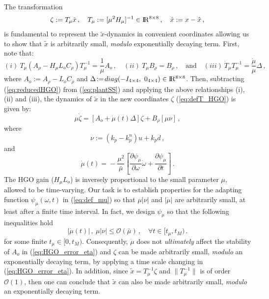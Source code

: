 \documentclass[letterpaper, 10 pt, journal, twocolumn]{IEEEtran}  %
\def\re{{\rm I}\! {\rm R}}
\theoremstyle{plain}
\theoremstyle{definition}
\theoremstyle{remark}
\begin{document}
The transformation \cite{OK:97}
%
\begin{equation}
\zeta:=T_{\mu}\tilde{x}\,, \quad T_\mu:=[\mu^2
H_\mu]^{-1} \in \re^{8 \times 8}\,, \quad \tilde{x}:= x-\hat{x}\,,\label{eq:defT_HGO}
\end{equation}
%
is fundamental to represent the $\tilde{x}$-dynamics in 
convenient coordinates allowing us to show that $\tilde{x}$ is
arbitrarily small, {\em modulo} exponentially decaying term. First,
note that:
%
$$(i) \ T_\mu(A_\rho-H_\mu L_o
C_\rho)T_\mu^{-1}\!=\!\frac{1}{\mu}A_o\,, \quad (ii) \ T_\mu B_\rho\!=\!B_\rho\,, \quad \mbox{and} \quad
(iii) \ \dot{T}_\mu T_\mu^{-1}\!=\!\frac{\dot{\mu}}{\mu}
\Delta\,,$$
%
where $A_o\!:=\!A_\rho\!-\!L_o C_\rho$ and
$\Delta\!:=\!\mbox{diag}(-I_{4 \times 4}, \ 0_{4 \times 4}) \in \re^{8 \times 8}$.
%
Then, subtracting (\ref{eq:reducedHGO}) from
(\ref{eq:plantSS}) and applying the above
relationships (i),
(ii) and (iii), the dynamics of $\tilde{x}$ 
in the new coordinates $\zeta$ (\ref{eq:defT_HGO}) is given by:
%
\begin{equation}
\mu \dot{\zeta} = [A_o+ \dot{\mu}(t) \Delta] \zeta + B_\rho [\mu
\nu]\,, \label{eq:HGO_error_eta}
\end{equation}
%
where %
%
\begin{equation}
\nu:=(k_p-k_p^n)u+k_p d\,,\label{eq:def_nu}
\end{equation}
%
and
%
\begin{equation}
\dot{\mu}(t)\!=\!-\frac{\mu^2}{\bar{\mu}} \left[\frac{\partial
\psi_\mu}{\partial \omega} \dot{\omega}+\frac{\partial
\psi_\mu}{\partial t}\right]\,. \label{eq:def_mudot}
\end{equation}
%
The HGO gain ($H_\mu L_o$) is inversely proportional to the small parameter $\mu$,
allowed to be time-varying. %
Our task is to establish properties for the adapting
function $\psi_\mu(\omega,t)$ in (\ref{eq:def_mu}) so that $\mu
|\nu|$ and $|\dot{\mu}|$ are arbitrarily small, at least after a
finite time interval. In fact, we design $\psi_\mu$ so that the following inequalities hold
%
\begin{equation}
|\dot{\mu}(t)|\,, \ \mu |\nu| \leq \mathcal{O}(\bar{\mu})\,, \quad
\forall t \in [t_\mu,t_M)\,. \label{eq:mudotmunu}
\end{equation}
%
for  some finite $t_\mu \in [0,t_M)$.  Consequently, $\dot{\mu}$ does not {\em
ultimately} affect the stability of $A_o$ in
(\ref{eq:HGO_error_eta}) and $\zeta$  can be made
arbitrarily small, {\em modulo} an exponentially decaying term, by applying a time scale changing in (\ref{eq:HGO_error_eta}). In addition, since $\tilde{x} = T_\mu^{-1} \zeta$ and $\|T_\mu^{-1}\|$ is of order $\mathcal{O}(1)$, then one can conclude that $\tilde{x}$ can also be made
arbitrarily small, {\em modulo} an exponentially decaying term.
\end{document}
